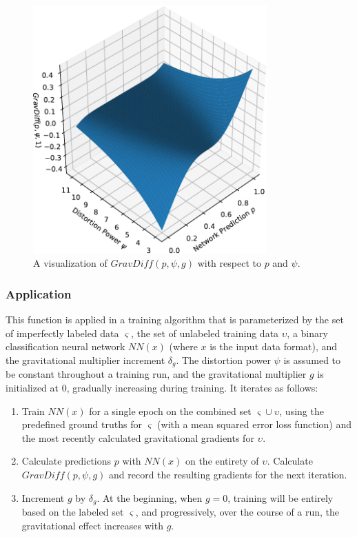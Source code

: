 \documentclass[10pt]{article}
\begin{document}
\begin{figure}[H]
    \centering
    \includegraphics[width=0.8\textwidth]{grav_diff}
    \caption{\label{grav_diff} A visualization of $GravDiff(p, \psi, g)$ with respect to $p$ and $\psi$.}
\end{figure}

\subsubsection{Application}

This function is applied in a training algorithm that is parameterized by the set of imperfectly labeled data $\varsigma$, the set of unlabeled training data $\upsilon$, a binary classification neural network $NN(x)$ (where $x$ is the input data format), and the gravitational multiplier increment $\delta_g$. The distortion power $\psi$ is assumed to be constant throughout a training run, and the gravitational multiplier $g$ is initialized at 0, gradually increasing during training. It iterates as follows:

\begin{enumerate}
    \item Train $NN(x)$ for a single epoch on the combined set $\varsigma \cup \upsilon$, using the predefined ground truths for $\varsigma$ (with a mean squared error loss function) and the most recently calculated gravitational gradients for $\upsilon$.
    \item Calculate predictions $p$ with $NN(x)$ on the entirety of $\upsilon$. Calculate $GravDiff(p, \psi, g)$ and record the resulting gradients for the next iteration.
    \item Increment $g$ by $\delta_{g}$. At the beginning, when $g = 0$, training will be entirely based on the labeled set $\varsigma$, and progressively, over the course of a run, the gravitational effect increases with $g$.
\end{enumerate}
\end{document}

